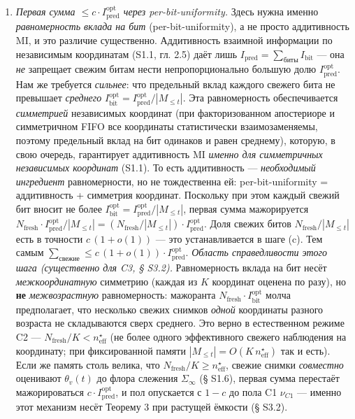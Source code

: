\documentclass[12pt]{iopart}
\begin{document}
\begin{enumerate}

\def\labelenumi{(\alph{enumi})}

\setcounter{enumi}{1}

\item

  \emph{Первая сумма \(\le c\cdot I^{\text{opt}}_{\text{pred}}\) через per-bit-uniformity.} Здесь нужна именно \emph{равномерность вклада на бит} (per-bit-uniformity), а не просто аддитивность MI, и это различие существенно. Аддитивность взаимной информации по независимым координатам (S1.1, \cite{CoverThomas2006} гл. 2.5) даёт лишь \(I_{\text{pred}} = \sum_{\text{биты}} I_{\text{bit}}\) --- она \emph{не} запрещает свежим битам нести непропорционально большую долю \(I^{\text{opt}}_{\text{pred}}\). Нам же требуется \emph{сильнее}: что предельный вклад каждого свежего бита не превышает \emph{среднего} \(I^{\text{opt}}_{\text{bit}} = I_{\text{pred}}^{\text{opt}}/|M_{\le t}|\). Эта равномерность обеспечивается \emph{симметрией} независимых координат (при факторизованном апостериоре и симметричном FIFO все координаты статистически взаимозаменяемы, поэтому предельный вклад на бит одинаков и равен среднему), которую, в свою очередь, гарантирует аддитивность MI \emph{именно для симметричных независимых координат} (S1.1). То есть аддитивность --- \emph{необходимый ингредиент} равномерности, но не тождественна ей: per-bit-uniformity = аддитивность + симметрия координат. Поскольку при этом каждый свежий бит вносит не более \(I^{\text{opt}}_{\text{bit}} = I_{\text{pred}}^{\text{opt}}/|M_{\le t}|\), первая сумма мажорируется \(N_{\text{fresh}}\cdot I_{\text{pred}}^{\text{opt}}/|M_{\le t}| = (N_{\text{fresh}}/|M_{\le t}|)\cdot I_{\text{pred}}^{\text{opt}}\). Доля свежих битов \(N_{\text{fresh}}/|M_{\le t}|\) есть в точности \(c\,(1+o(1))\) --- это устанавливается в шаге (c). Тем самым \(\sum_{\text{свежие}} \le c\,(1+o(1))\cdot I_{\text{pred}}^{\text{opt}}\). \emph{Область справедливости этого шага (существенно для C3, § S3.2).} Равномерность вклада на бит несёт \emph{межкоординатную} симметрию (каждая из \(K\) координат оценена по разу), но \textbf{не} \emph{межвозрастную} равномерность: мажоранта \(N_{\text{fresh}}\cdot I^{\text{opt}}_{\text{bit}}\) молча предполагает, что несколько свежих снимков \emph{одной} координаты разного возраста не складываются сверх среднего. Это верно в естественном режиме C2 --- \(N_{\text{fresh}}/K < n_{\text{eff}}^\star\) (не более одного эффективного свежего наблюдения на координату; при фиксированной памяти \(|M_{\le t}| = O(K\,n_{\text{eff}}^\star)\) так и есть). Если же память столь велика, что \(N_{\text{fresh}}/K \ge n_{\text{eff}}^\star\), свежие снимки \emph{совместно} оценивают \(\theta_v(t)\) до флора слежения \(\Sigma_\infty\) (§ S1.6), первая сумма перестаёт мажорироваться \(c\cdot I_{\text{pred}}^{\text{opt}}\), и пол опускается с \(1-c\) до пола C1 \(\nu_{C1}\) --- именно этот механизм несёт Теорему 3 при растущей ёмкости (§ S3.2).


\end{enumerate}
\end{document}
